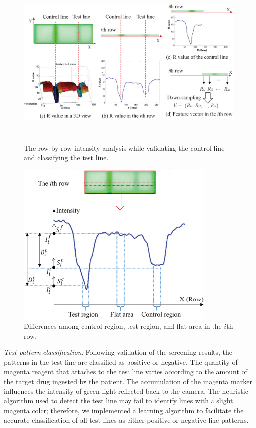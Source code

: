 \begin{figure}[ht]
\begin{center}
\includegraphics[height=8.5cm]{image/ket/row_by_row.eps}
\caption{The row-by-row intensity analysis while validating the control line and classifying the test line.}
\label{fig:row_by_row}
\end{center}
\end{figure}


\begin{figure}[ht]
\begin{center}
\includegraphics[height=8cm]{image/ket/delta.eps}
\caption{Differences among control region, test region, and flat area in the $i$th row.}
\label{fig:energy_delta}
\end{center}
\end{figure}


\emph{Test pattern classification: }
Following validation of the screening results, the patterns in the test line are classified as positive or negative. The quantity of magenta reagent that attaches to the test line varies according to the amount of the target drug ingested by the patient. The accumulation of the magenta marker influences the intensity of green light reflected back to the camera. The heuristic algorithm used to detect the test line may fail to identify lines with a slight magenta color; therefore, we implemented a learning algorithm to facilitate the accurate classification of all test lines as either positive or negative line patterns.

